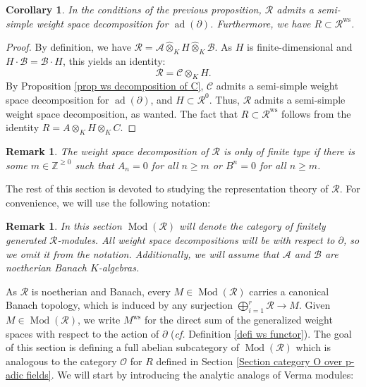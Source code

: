 \documentclass{amsart}
\newtheorem{obs}[defi]{{Remark}}
\newtheorem{coro}[defi]{Corollary}
\newcommand{\Mod}{\operatorname{Mod}}
\newcommand{\OX}{\mathcal{O}}
\begin{document}
\begin{coro}
In the conditions of the previous proposition, $\mathscr{R}$ admits a semi-simple weight space decomposition for $\operatorname{ad}(\partial)$. Furthermore, we have $R\subset \mathscr{R}^{\operatorname{ws}}$.
\end{coro}
\begin{proof}
By definition, we have $\mathscr{R}=\mathscr{A}\widehat{\otimes}_KH\widehat{\otimes}_K\mathscr{B}$. As $H$ is finite-dimensional and $H\cdot\mathscr{B}=\mathscr{B}\cdot H$, this yields an identity:
\begin{equation*}
    \mathscr{R}=\mathscr{C} \otimes_KH.
\end{equation*}
By Proposition \ref{prop ws decomposition of C}, $\mathscr{C}$ admits a semi-simple weight space decomposition for $\operatorname{ad}(\partial)$, and $H\subset \mathscr{R}^{0}$. Thus,  $\mathscr{R}$ admits a semi-simple weight space decomposition, as wanted. The fact that $R\subset \mathscr{R}^{\operatorname{ws}}$ follows from the identity $R=A\otimes_KH\otimes_KC$.
\end{proof}
\begin{obs}
The weight space decomposition of $\mathscr{R}$ is only of finite type if there is some $m\in\mathbb{Z}^{\geq 0}$ such that $A_n=0$ for all $n\geq m$ or $B^n=0$ for all $n\geq m$.
\end{obs}
The rest of this section is devoted to studying the representation theory of $\mathscr{R}$. For convenience, we will use the following notation:
\begin{obs}
In this section $\Mod(\mathscr{R})$ will denote the category of finitely generated $\mathscr{R}$-modules. All weight space decompositions will be with respect to $\partial$, so we omit it from the notation. Additionally, we will assume that $\mathscr{A}$ and $\mathscr{B}$ are noetherian Banach $K$-algebras.
\end{obs}
As $\mathscr{R}$ is noetherian and Banach, every $M\in \Mod(\mathscr{R})$  carries a canonical Banach topology, which is induced by any surjection $\bigoplus_{i=1}^r\mathscr{R}\rightarrow M$. Given $M\in \Mod(\mathscr{R})$, we write $M^{\operatorname{ws}}$
for the direct sum of the generalized weight spaces with respect to the action of $\partial$ (\emph{cf.} Definition \ref{defi ws functor}). The goal of this section is defining a full abelian subcategory of $\Mod(\mathscr{R})$ which is analogous to the category $\OX$ for $R$ defined in Section \ref{Section category O over p-adic fields}. We will start by introducing the analytic analogs of Verma modules:
\end{document}
